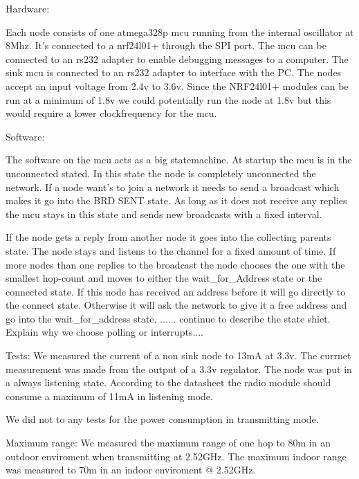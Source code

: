 Hardware: 

Each node consists of one atmega328p mcu running from the
internal oscillator at 8Mhz. It's connected to a nrf24l01+ through the
SPI port. The mcu can be connected to an rs232 adapter to enable
debugging messages to a computer. The sink mcu is connected to an
rs232 adapter to interface with the PC. The nodes accept an input
voltage from 2.4v to 3.6v. Since the NRF24l01+ modules can be run at a
minimum of 1.8v we could potentially run the node at 1.8v but this
would require a lower clockfrequency for the mcu.

Software:

The software on the mcu acts as a big statemachine. At startup the mcu
is in the unconnected stated. In this state the node is completely
unconnected the network. If a node want's to join a network it needs
to send a broadcast which makes it go into the BRD SENT state. As long
as it does not receive any replies the mcu stays in this state and
sends new broadcasts with a fixed interval.

If the node gets a reply from another node it goes into the
collecting parents state. The node stays and listens to the channel for
a fixed amount of time. If more nodes than one replies to the
broadcast the node chooses the one with the smallest hop-count and moves to
either the wait_for_Address state or the connected state.  If this
node has received an address before it will go directly to the connect
state. Otherwise it will ask the network to give it a free address and
go into the wait_for_address state.  ...... continue to describe the
state shiet. Explain why we choose polling or interrupts....


Tests:
We measured the current of a non sink node to 13mA at 3.3v. The
currnet measurement was made from the output of a 3.3v regulator. 
The node was put in a always listening state. According to the 
datasheet the radio module should consume a maximum of 11mA in
listening mode.

We did not to any tests for the power consumption in transmitting
mode.

Maximum range:
We measured the maximum range of one hop to 80m in an outdoor 
enviroment when transmitting at 2.52GHz. 
The maximum indoor range was measured to 70m in an indoor
enviroment @ 2.52GHz.
 
